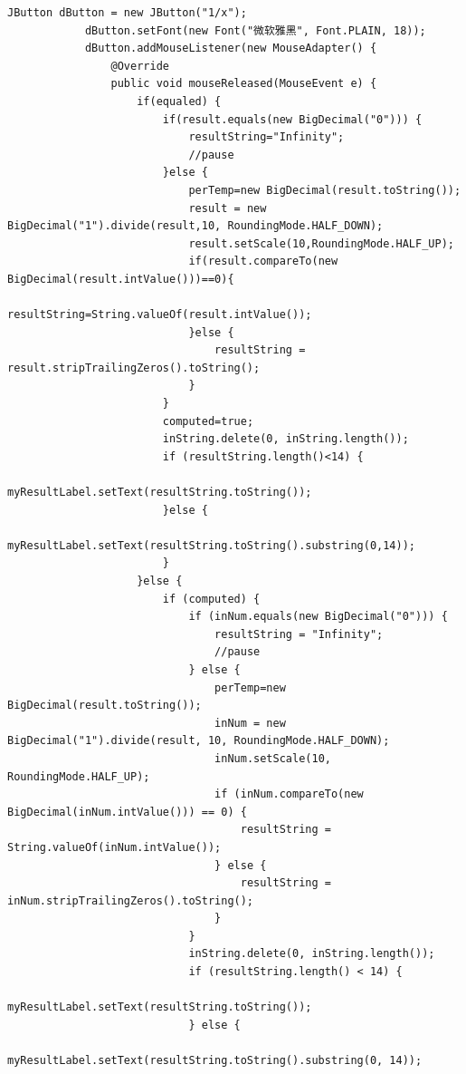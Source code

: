 \documentclass{ctexart}
\begin{document}
\begin{lstlisting}[caption=冗杂的代码]
            JButton dButton = new JButton("1/x");
            dButton.setFont(new Font("微软雅黑", Font.PLAIN, 18));
            dButton.addMouseListener(new MouseAdapter() {
                @Override
                public void mouseReleased(MouseEvent e) {
                    if(equaled) {
                        if(result.equals(new BigDecimal("0"))) {
                            resultString="Infinity";
                            //pause
                        }else {
                            perTemp=new BigDecimal(result.toString());
                            result = new BigDecimal("1").divide(result,10, RoundingMode.HALF_DOWN);
                            result.setScale(10,RoundingMode.HALF_UP);
                            if(result.compareTo(new BigDecimal(result.intValue()))==0){
                                resultString=String.valueOf(result.intValue());
                            }else {
                                resultString = result.stripTrailingZeros().toString();
                            }
                        }
                        computed=true;
                        inString.delete(0, inString.length());
                        if (resultString.length()<14) {
                            myResultLabel.setText(resultString.toString());
                        }else {
                            myResultLabel.setText(resultString.toString().substring(0,14));
                        }
                    }else {
                        if (computed) {
                            if (inNum.equals(new BigDecimal("0"))) {
                                resultString = "Infinity";
                                //pause
                            } else {
                                perTemp=new BigDecimal(result.toString());
                                inNum = new BigDecimal("1").divide(result, 10, RoundingMode.HALF_DOWN);
                                inNum.setScale(10, RoundingMode.HALF_UP);
                                if (inNum.compareTo(new BigDecimal(inNum.intValue())) == 0) {
                                    resultString = String.valueOf(inNum.intValue());
                                } else {
                                    resultString = inNum.stripTrailingZeros().toString();
                                }
                            }
                            inString.delete(0, inString.length());
                            if (resultString.length() < 14) {
                                myResultLabel.setText(resultString.toString());
                            } else {
                                myResultLabel.setText(resultString.toString().substring(0, 14));

\end{lstlisting}
\end{document}

